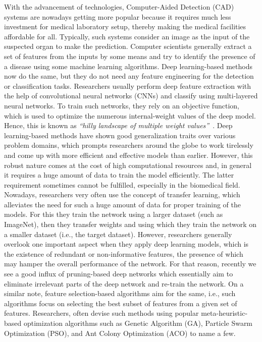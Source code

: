 \documentclass[final,3p,times]{elsarticle}
\begin{document}
With the advancement of technologies, Computer-Aided Detection (CAD) systems are nowadays getting more popular because it requires much less investment for medical laboratory setup, thereby making the medical facilities affordable for all. {Typically,} such systems consider an image as the input of the suspected organ to make the prediction. Computer scientists generally extract a set of features from the inputs by some means and {try to} identify the presence of a disease using some machine learning algorithms. Deep learning-based methods now do the same, but they do not need any feature engineering for the detection or classification tasks. Researchers usually perform deep feature extraction with the help of convolutional neural networks (CNNs) and classify using multi-layered neural networks. To train such networks, they rely on an objective function, which is used to optimize the numerous internal-weight values of the deep model. Hence, this is known as \textit{“hilly landscape of multiple weight values”}~\cite{lecun2015deep}. Deep learning-based methods have shown good generalization traits over {various problem domains}, which prompts researchers around the globe to work tirelessly and come up with more efficient and effective models than earlier. However, this robust nature comes at the cost of high computational resources {and, in general it requires a huge amount of data to train the model efficiently. The latter requirement} sometimes cannot be fulfilled, especially in the biomedical field.\\
{Nowadays,} researchers very often use the concept of transfer {learning,} which alleviates the need for such a huge amount of data for proper training of the models. For this they train the network using a larger dataset (such as ImageNet), then {they transfer weights and using which they} train the network on a smaller dataset (i.e., the target dataset). However, researchers generally overlook one important aspect when they apply deep learning models, which is the existence of redundant or non-informative features, the presence of which may hamper the overall performance of the network. For that reason, recently we see a good influx of {pruning-based} deep networks which essentially aim to eliminate irrelevant parts of the deep network and re-train the network. On a similar note, feature selection-based algorithms aim for the same, i.e., such algorithms focus on selecting the best subset of features from a given set of features. {Researchers, often devise such methods using popular meta-heuristic-based} optimization algorithms such as Genetic Algorithm (GA), Particle Swarm Optimization (PSO), and Ant Colony Optimization (ACO) to name a few.\\
\end{document}
